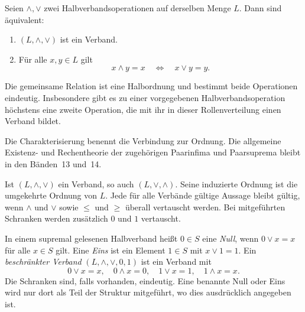 \begin{theorem}
\label{b45guide:thm:compatible}
Seien $\wedge,\vee$ zwei Halbverbandsoperationen auf derselben Menge $L$.
Dann sind äquivalent:
\begin{enumerate}
\item $(L,\wedge,\vee)$ ist ein Verband.
\item Für alle $x,y\in L$ gilt
\[
 x\wedge y=x\quad\Longleftrightarrow\quad x\vee y=y.
\]
\end{enumerate}
Die gemeinsame Relation ist eine Halbordnung und bestimmt beide
Operationen eindeutig. Insbesondere gibt es zu einer vorgegebenen
Halbverbandsoperation höchstens eine zweite Operation, die mit ihr
in dieser Rollenverteilung einen Verband bildet. \cite{project,nation}
\end{theorem}

Die Charakterisierung benennt die Verbindung zur Ordnung.
Die allgemeine Existenz- und Rechentheorie der zugehörigen
Paarinfima und Paarsuprema bleibt in den Bänden~13 und~14.

\begin{theorem}[Dualitätsprinzip]
\label{b45guide:thm:duality}
Ist $(L,\wedge,\vee)$ ein Verband, so auch $(L,\vee,\wedge)$.
Seine induzierte Ordnung ist die umgekehrte Ordnung von $L$.
Jede für alle Verbände gültige Aussage bleibt gültig, wenn
$\wedge$ und $\vee$ sowie $\leq$ und $\geq$ überall vertauscht werden.
Bei mitgeführten Schranken werden zusätzlich $0$ und $1$ vertauscht.
\end{theorem}

\begin{definition}
\label{b45guide:def:bounds}
In einem supremal gelesenen Halbverband heißt $0\in S$ eine
\emph{Null}, wenn $0\vee x=x$ für alle $x\in S$ gilt.
Eine \emph{Eins} ist ein Element $1\in S$ mit $x\vee1=1$.
Ein \emph{beschränkter Verband} $(L,\wedge,\vee,0,1)$ ist ein
Verband mit
\[
 0\vee x=x,\quad 0\wedge x=0,\quad
 1\vee x=1,\quad 1\wedge x=x .
\]
Die Schranken sind, falls vorhanden, eindeutig. Eine benannte Null
oder Eins wird nur dort als Teil der Struktur mitgeführt, wo dies
ausdrücklich angegeben ist.
\end{definition}
